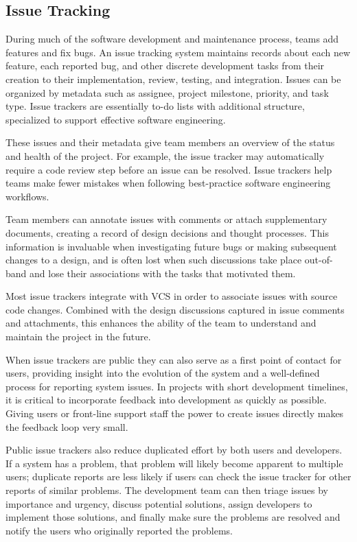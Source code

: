 \subsection{Issue Tracking}

During much of the software development and maintenance process, teams
add features and fix bugs. An issue tracking system maintains records
about each new feature, each reported bug, and other discrete
development tasks from their creation to their implementation, review,
testing, and integration. Issues can be organized by metadata such as
assignee, project milestone, priority, and task type. Issue trackers
are essentially to-do lists with additional structure, specialized to
support effective software engineering.

These issues and their metadata give team members an overview of the
status and health of the project. For example, the issue tracker may
automatically require a code review step before an issue can be
resolved. Issue trackers help teams make fewer mistakes when following
best-practice software engineering workflows.

Team members can annotate issues with comments or attach supplementary
documents, creating a record of design decisions and thought
processes. This information is invaluable when investigating future
bugs or making subsequent changes to a design, and is often lost when
such discussions take place out-of-band and lose their associations
with the tasks that motivated them.

Most issue trackers integrate with VCS in order to associate issues
with source code changes. Combined with the design discussions
captured in issue comments and attachments, this enhances the ability
of the team to understand and maintain the project in the future.

When issue trackers are public they can also serve as a first point of
contact for users, providing insight into the evolution of the system
and a well-defined process for reporting system issues. In projects
with short development timelines, it is critical to incorporate
feedback into development as quickly as possible. Giving users or
front-line support staff the power to create issues directly makes the
feedback loop very small.

Public issue trackers also reduce duplicated effort by both users and
developers. If a system has a problem, that problem will likely become
apparent to multiple users; duplicate reports are less likely if users
can check the issue tracker for other reports of similar problems. The
development team can then triage issues by importance and urgency,
discuss potential solutions, assign developers to implement those
solutions, and finally make sure the problems are resolved and notify
the users who originally reported the problems.

